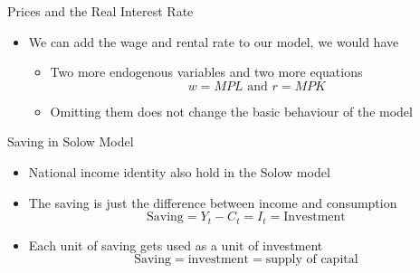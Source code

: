 \documentclass[aspectratio=1610]{beamer}
\begin{document}
\begin{frame}[wide]{Prices and the Real Interest Rate}
	\begin{itemize}
		\item We can add the wage and rental rate to our model, we would have 
		\begin{itemize}
			\item Two more endogenous variables and two more equations
			\[w = MPL \text{  and  } r = MPK	\]
			\item Omitting them does not change the basic behaviour of the model
		\end{itemize}
	\end{itemize}
\end{frame}

%		

\begin{frame}[wide]{Saving in Solow Model}
	\begin{itemize}
		\item National income identity also hold in the Solow model
		\item The saving is just the difference between income and consumption
				\[\text{Saving} = Y_t - C_t = I_t = \text{Investment}\]
		\item Each unit of saving gets used as a unit of investment
		\[\text{Saving} = \text{investment} = \text{supply of capital} \]
	\end{itemize}
\end{frame}
\end{document}
